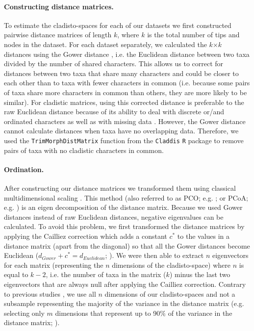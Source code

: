 \documentclass[12pt,a4paper]{article}
\begin{document}
\paragraph{Constructing distance matrices.}
To estimate the cladisto-spaces for each of our datasets we first constructed pairwise distance matrices of length $k$, where $k$ is the total number of tips and nodes in the dataset.
For each dataset separately, we calculated the $k$$\times$$k$ distances using the Gower distance \citep{Gower71}, i.e. the Euclidean distance between two taxa divided by the number of shared characters. 
This allows us to correct for distances between two taxa that share many characters and could be closer to each other than to taxa with fewer characters in common (i.e. because some pairs of taxa share more characters in common than others, they are more likely to be similar).
For cladistic matrices, using this corrected distance is preferable to the raw Euclidean distance because of its ability to deal with discrete or/and ordinated characters as well as with missing data \citep{anderson2012using}.
However, the Gower distance cannot calculate distances when taxa have no overlapping data.
Therefore, we used the \texttt{TrimMorphDistMatrix} function from the \texttt{Claddis} \texttt{R} package \citep{Claddis} to remove pairs of taxa with no cladistic characters in common.

\paragraph{Ordination.}
After constructing our distance matrices we transformed them using classical multidimensional scaling \citep[MDS;][]{torgerson1965multidimensional,GOWER01121966,cailliez1983analytical}.
This method (also referred to as PCO; e.g. \citealt{Brusatte2015}; or PCoA; e.g. \citealt{paradisape:2004}) is an eigen decomposition of the distance matrix.
Because we used Gower distances instead of raw Euclidean distances, negative eigenvalues can be calculated.
To avoid this problem, we first transformed the distance matrices by applying the Cailliez correction \citep{cailliez1983analytical} which adds a constant $c^*$ to the values in a distance matrix (apart from the diagonal) so that all the Gower distances become Euclidean ($d_{Gower}+c^*=d_{Euclidean}$; \citealt{cailliez1983analytical}). 
We were then able to extract $n$ eigenvectors for each matrix (representing the $n$ dimensions of the cladisto-space) where $n$ is equal to $k-2$, i.e. the number of taxa in the matrix ($k$) minus the last two eigenvectors that are always null after applying the Cailliez correction.
Contrary to previous studies \citep[e.g][]{brusatte50,cisneros2010,prentice2011,anderson2012using,Hughes20082013,bentonmodels2014}, we use all $n$ dimensions of our cladisto-spaces and not a subsample representing the majority of the variance in the distance matrix (e.g. selecting only $m$ dimensions that represent up to 90\% of the variance in the distance matrix; \citealt{Brusatte12092008,toljagictriassic-jurassic2013}). %
\end{document}
